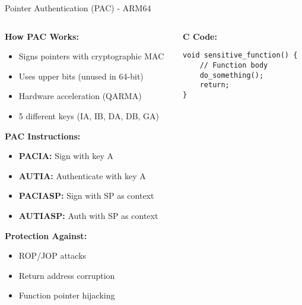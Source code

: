 \documentclass[aspectratio=169,12pt]{beamer}
\begin{document}
\begin{frame}[fragile]{Pointer Authentication (PAC) - ARM64}
    \begin{columns}
        \begin{column}{0.5\textwidth}
            \textbf{How PAC Works:}
            \begin{itemize}
                \item Signs pointers with cryptographic MAC
                \item Uses upper bits (unused in 64-bit)
                \item Hardware acceleration (QARMA)
                \item 5 different keys (IA, IB, DA, DB, GA)
            \end{itemize}
            
            \vspace{0.3cm}
            \textbf{PAC Instructions:}
            \begin{itemize}
                \item \textbf{PACIA:} Sign with key A
                \item \textbf{AUTIA:} Authenticate with key A
                \item \textbf{PACIASP:} Sign with SP as context
                \item \textbf{AUTIASP:} Auth with SP as context
            \end{itemize}
            
            \vspace{0.3cm}
            \textbf{Protection Against:}
            \begin{itemize}
                \item ROP/JOP attacks
                \item Return address corruption
                \item Function pointer hijacking
            \end{itemize}
        \end{column}
        \begin{column}{0.5\textwidth}
            \begin{tcolorbox}[colback=blue!10]
                \small
                \textbf{C Code:}
                \begin{verbatim}
void sensitive_function() {
    // Function body
    do_something();
    return;
}
                \end{verbatim}
            \end{tcolorbox}
            

\end{column}
\end{columns}
\end{frame}
\end{document}
